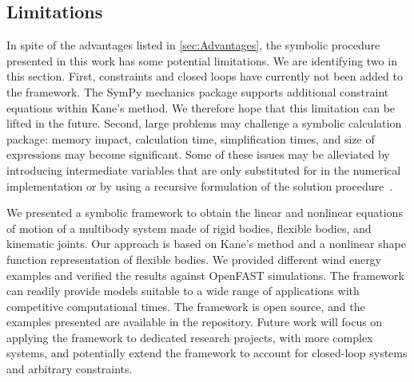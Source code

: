 \documentclass[wes, manuscript]{copernicus}
\begin{document}
\subsection{Limitations}
In spite of the advantages listed in \autoref{sec:Advantages}, the symbolic procedure presented in this work has some potential limitations.
We are identifying two in this section.
First, constraints and closed loops have currently not been added to the framework.
The SymPy mechanics package supports additional constraint equations within Kane's method.
We therefore hope that this limitation can be lifted in the future.
Second, large problems may challenge a symbolic calculation package: memory impact, calculation time, simplification times, and size of expressions may become significant.
Some of these issues may be alleviated by introducing intermediate variables that are only substituted for in the numerical implementation or by using a recursive formulation of the solution procedure~\citep{branlard:2019flex}.



\conclusions

We presented a symbolic framework to obtain the linear and nonlinear equations of motion of a multibody system made of rigid bodies, flexible bodies, and kinematic joints.
Our approach is based on Kane's method and a nonlinear shape function representation of flexible bodies.
We provided different wind energy examples and verified the results against OpenFAST simulations.
The framework can readily provide models suitable to a wide range of applications with competitive computational times.
The framework is open source, and the examples presented are available in the repository.
Future work will focus on applying the framework to dedicated research projects, with more complex systems, and potentially extend the framework to account for closed-loop systems and arbitrary constraints.






\end{document}
